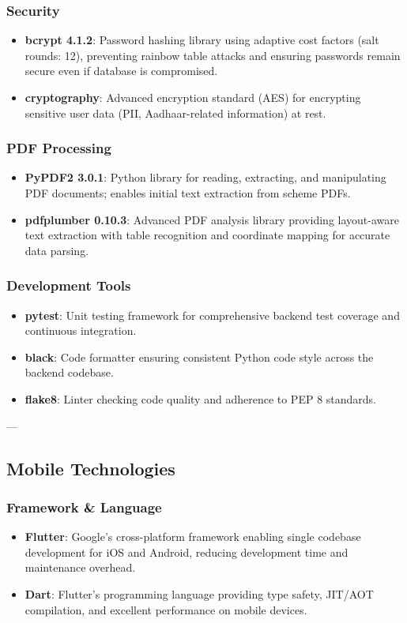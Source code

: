 \subsubsection{Security}
\begin{itemize}
    \item \textbf{bcrypt 4.1.2}: Password hashing library using adaptive cost factors (salt rounds: 12), preventing rainbow table attacks and ensuring passwords remain secure even if database is compromised.
    \item \textbf{cryptography}: Advanced encryption standard (AES) for encrypting sensitive user data (PII, Aadhaar-related information) at rest.
\end{itemize}

\subsubsection{PDF Processing}
\begin{itemize}
    \item \textbf{PyPDF2 3.0.1}: Python library for reading, extracting, and manipulating PDF documents; enables initial text extraction from scheme PDFs.
    \item \textbf{pdfplumber 0.10.3}: Advanced PDF analysis library providing layout-aware text extraction with table recognition and coordinate mapping for accurate data parsing.
\end{itemize}

\subsubsection{Development Tools}
\begin{itemize}
    \item \textbf{pytest}: Unit testing framework for comprehensive backend test coverage and continuous integration.
    \item \textbf{black}: Code formatter ensuring consistent Python code style across the backend codebase.
    \item \textbf{flake8}: Linter checking code quality and adherence to PEP 8 standards.
\end{itemize}

---

\subsection{Mobile Technologies}

\subsubsection{Framework \& Language}
\begin{itemize}
    \item \textbf{Flutter}: Google's cross-platform framework enabling single codebase development for iOS and Android, reducing development time and maintenance overhead.
    \item \textbf{Dart}: Flutter's programming language providing type safety, JIT/AOT compilation, and excellent performance on mobile devices.
\end{itemize}

